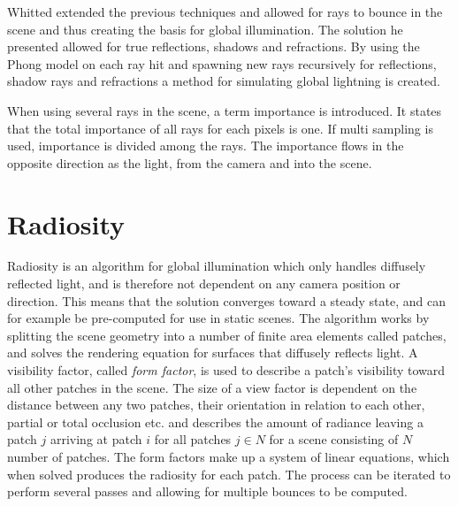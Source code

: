 \documentclass[a4paper, 12pt]{report}
\begin{document}
Whitted extended the previous techniques and allowed for rays to bounce in the scene and thus creating the basis for global illumination.
The solution he presented allowed for true reflections, shadows and refractions.
By using the Phong model on each ray hit and spawning new rays recursively for reflections, shadow rays and refractions a method for simulating global lightning is created.

When using several rays in the scene, a term importance is introduced.
It states that the total importance of all rays for each pixels is one. 
If multi sampling is used, importance is divided among the rays.
The importance flows in the opposite direction as the light, from the camera and into the scene.

\section{Radiosity}
Radiosity is an algorithm for global illumination which only handles diffusely reflected light, and is therefore not dependent on any camera position or direction. This means that the solution converges toward a steady state, and can for example be pre-computed for use in static scenes. The algorithm works by splitting the scene geometry into a number of finite area elements called patches, and solves the rendering equation for surfaces that diffusely reflects light. A visibility factor, called \emph{form factor}, is used to describe a patch's visibility toward all other patches in the scene. The size of a view factor is dependent on the distance between any two patches, their orientation in relation to each other, partial or total occlusion etc. and describes the amount of radiance leaving a patch $j$ arriving at patch $i$ for all patches $j \in N$ for a scene consisting of $N$ number of patches. The form factors make up a system of linear equations, which when solved produces the radiosity for each patch. The process can be iterated to perform several passes and allowing for multiple bounces to be computed.
\end{document}

